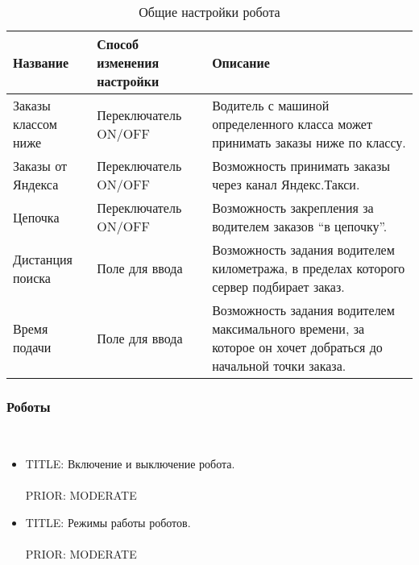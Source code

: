       \begin{table}[h]
        \begin{center}
        \label{robot_general_settings}
        \caption {Общие настройки робота}
        \setlength{\extrarowheight}{2mm}
        \begin{tabular}{|p{4cm}|p{3cm}|p{8cm}|}

          \hline     \textbf{Название}&\textbf{Способ изменения настройки}&\textbf{Описание} \\ [2mm]

          \hline   Заказы классом ниже & Переключатель ON/OFF & Водитель с машиной определенного класса может принимать заказы ниже по классу.\\ [2mm]

          \hline   Заказы от Яндекса & Переключатель ON/OFF & Возможность принимать заказы через канал Яндекс.Такси. \\ [2mm]
            
          \hline   Цепочка & Переключатель ON/OFF & Возможность закрепления за водителем заказов “в цепочку”. \\ [2mm]

          \hline   Дистанция поиска & Поле для ввода & Возможность задания водителем километража, в пределах которого сервер подбирает заказ. \\ [2mm]

          \hline   Время подачи & Поле для ввода & Возможность задания водителем максимального времени, за которое он хочет добраться до начальной точки заказа. \\ [2mm]

          \hline
        \end{tabular}
        \end{center}
      \end{table}

    \subsubsection{Роботы} \label{driver_app_robot_tab_robot_settings} \mbox{}\\

      \begin{itemize}

        \item{
          TITLE: Включение и выключение робота.\\
          \\
          PRIOR: MODERATE\\
          }

        \item{
          TITLE: Режимы работы роботов. \\
          \\
          PRIOR: MODERATE\\}
      \end{itemize}

